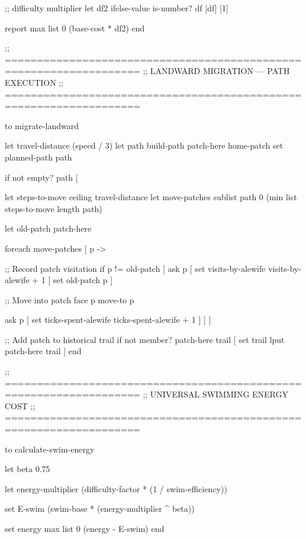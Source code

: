 \documentclass[
]{book}
\newenvironment{Shaded}{\begin{snugshade}}{\end{snugshade}}
\newcommand{\NormalTok}[1]{#1}
\begin{document}
\begin{Shaded}
\begin{Highlighting}[]
\NormalTok{  ;; difficulty multiplier}
\NormalTok{  let df2 ifelse{-}value is{-}number? df [df] [1]}

\NormalTok{  report max list 0 (base{-}cost * df2)}
\NormalTok{end}


\NormalTok{;; ===================================================================}
\NormalTok{;;  LANDWARD MIGRATION — PATH EXECUTION}
\NormalTok{;; ===================================================================}

\NormalTok{to migrate{-}landward}
  
\NormalTok{  let travel{-}distance (speed / 3)}
\NormalTok{  let path build{-}path patch{-}here home{-}patch}
\NormalTok{  set planned{-}path path}
  
\NormalTok{  if not empty? path [}

\NormalTok{    let steps{-}to{-}move ceiling travel{-}distance}
\NormalTok{    let move{-}patches sublist path 0 (min list steps{-}to{-}move length path)}
    
\NormalTok{    let old{-}patch patch{-}here}

\NormalTok{    foreach move{-}patches [ p {-}\textgreater{}}

\NormalTok{      ;; Record patch visitation}
\NormalTok{      if p != old{-}patch [}
\NormalTok{        ask p [ set visits{-}by{-}alewife visits{-}by{-}alewife + 1 ]}
\NormalTok{        set old{-}patch p}
\NormalTok{      ]}

\NormalTok{      ;; Move into patch}
\NormalTok{      face p}
\NormalTok{      move{-}to p}

\NormalTok{      ask p [}
\NormalTok{        set ticks{-}spent{-}alewife ticks{-}spent{-}alewife + 1}
\NormalTok{      ]}
\NormalTok{    ]}
\NormalTok{  ]}

\NormalTok{  ;; Add patch to historical trail}
\NormalTok{  if not member? patch{-}here trail [}
\NormalTok{    set trail lput patch{-}here trail}
\NormalTok{  ]}
\NormalTok{end}


\NormalTok{;; ===================================================================}
\NormalTok{;;  UNIVERSAL SWIMMING ENERGY COST}
\NormalTok{;; ===================================================================}

\NormalTok{to calculate{-}swim{-}energy}
  
\NormalTok{  let beta 0.75}

\NormalTok{  let energy{-}multiplier }
\NormalTok{      (difficulty{-}factor * (1 / swim{-}efficiency))}

\NormalTok{  set E{-}swim }
\NormalTok{      (swim{-}base * (energy{-}multiplier \^{} beta))}

\NormalTok{  set energy max list 0 (energy {-} E{-}swim)}
\NormalTok{end}
\end{Highlighting}
\end{Shaded}
\end{document}

